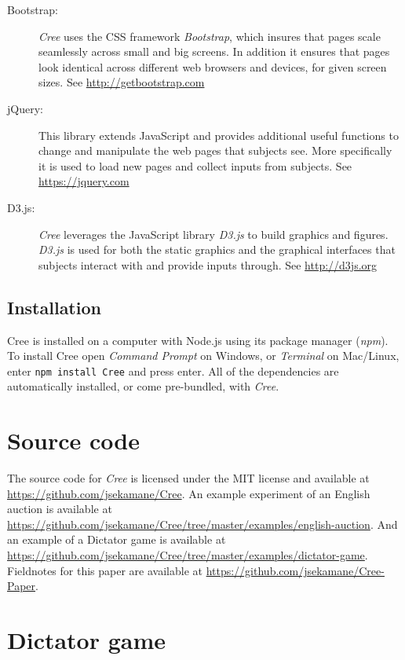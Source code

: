 \documentclass[preprint, 12pt]{elsarticle}
\newcommand{\Cree}{\emph{Cree}\xspace}
\begin{document}
\begin{description}
  \item[Bootstrap:] \Cree uses the CSS framework \emph{Bootstrap}, which insures that pages scale seamlessly across small and big screens. In addition it ensures that pages look identical across different web browsers and devices, for given screen sizes. See \url{http://getbootstrap.com}
  \item[jQuery:] This library extends JavaScript and provides additional useful functions to change and manipulate the web pages that subjects see. More specifically it is used to load new pages and collect inputs from subjects. See \url{https://jquery.com}
  \item[D3.js:] \Cree leverages the JavaScript library \emph{D3.js} to build graphics and figures. \emph{D3.js} is used for both the static graphics and the graphical interfaces that subjects interact with and provide inputs through. See \url{http://d3js.org}
\end{description}

\subsection{Installation}

Cree is installed on a computer with Node.js using its package manager (\emph{npm}). To install Cree open \emph{Command Prompt} on Windows, or \emph{Terminal} on Mac/Linux, enter \texttt{npm~install~Cree} and press enter. All of the dependencies are automatically installed, or come pre-bundled, with \Cree.

\section{Source code}

The source code for \Cree is licensed under the MIT license and available at \url{https://github.com/jsekamane/Cree}. An example experiment of an English auction is available at \url{https://github.com/jsekamane/Cree/tree/master/examples/english-auction}. And an example of a Dictator game is available at \url{https://github.com/jsekamane/Cree/tree/master/examples/dictator-game}. Fieldnotes for this paper are available at \url{https://github.com/jsekamane/Cree-Paper}.

\section{Dictator game}
\label{S:dictator}
\end{document}
